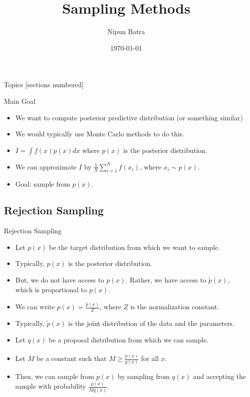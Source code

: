 \documentclass{beamer}
\begin{document}
\title{Sampling Methods}
\author{Nipun Batra}
\date{\today}
\maketitle

\begin{frame}{Topics}
    [sections numbered]
    \tableofcontents

\end{frame}

\begin{frame}{Main Goal}
    \begin{itemize}
        \item We want to compute posterior predictive distribution (or something similar)
        \pause \item We would typically use Monte Carlo methods to do this.
        \pause \item $I = \int f(x) p(x) dx$ where $p(x)$ is the posterior distribution.
        \pause \item We can approximate $I$ by $\frac{1}{N} \sum_{i=1}^N f(x_i)$, where $x_i \sim p(x)$.
        \pause \item Goal: sample from $p(x)$.
    \end{itemize}
\end{frame}

\subsection{Rejection Sampling}
    \begin{frame}{Rejection Sampling}
        \begin{itemize}
            \item Let $p(x)$ be the target distribution from which we want to sample.
            \pause \item Typically, $p(x)$ is the posterior distribution.
            \pause \item But, we do not have access to $p(x)$. Rather, we have access to $\tilde{p}(x)$, which is proportional to $p(x)$.
            \pause \item We can write $p(x) = \frac{\tilde{p}(x)}{Z}$, where $Z$ is the normalization constant.
            \pause \item Typically, $\tilde{p}(x)$ is the joint distribution of the data and the parameters.
            \pause \item Let $q(x)$ be a proposal distribution from which we can sample.
            \pause \item Let $M$ be a constant such that $M \geq \frac{\tilde{p(x)}}{q(x)}$ for all $x$.
            \pause \item Then, we can sample from $p(x)$ by sampling from $q(x)$ and accepting the sample with probability $\frac{p(x)}{M q(x)}$.
        \end{itemize}
        
    \end{frame}
\end{document}
